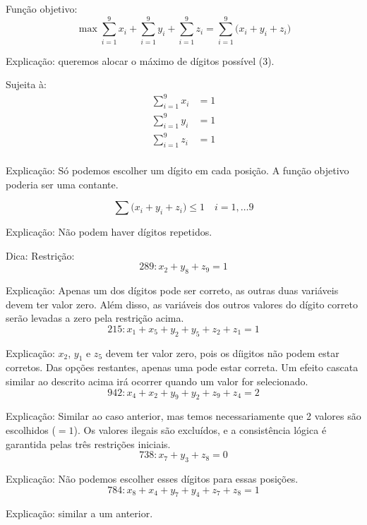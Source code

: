 \documentclass{article}
\begin{document}
Função objetivo:
\[
    \max \sum_{i = 1}^{9} x_i + \sum_{i = 1}^{9} y_i + \sum_{i = 1}^{9} z_i = \sum_{i = 1}^{9} \bigl(x_i + y_i + z_i\bigr)
\]

Explicação: queremos alocar o máximo de dígitos possível (3).

Sujeita à:
\begin{align*}
    \sum_{i=1}^{9} x_i &= 1\\
    \sum_{i=1}^{9} y_i &= 1\\
    \sum_{i=1}^{9} z_i &= 1\\
\end{align*}

Explicação: Só podemos escolher um dígito em cada posição. A função objetivo poderia ser uma contante.

\[ 
    \sum \big(x_i + y_i + z_i\big) \leq 1\quad i = 1,\dots9
\]

Explicação: Não podem haver dígitos repetidos.

\centering Dica: Restrição: 
    \[289\colon x_2 + y_8 + z_9 = 1 \]
    
    Explicação: Apenas um dos dígitos pode ser correto, as outras duas variáveis devem ter valor zero. Além disso, as variáveis dos outros valores do dígito correto serão levadas a zero pela restrição acima.
    \[215\colon x_1 + x_5 + y_2 + y_5 + z_2 + z_1 = 1 \]
    
    Explicação: $x_2$, $y_1$ e $z_5$ devem ter valor zero, pois os díigitos não podem estar corretos. Das opções restantes, apenas uma pode estar correta. Um efeito cascata similar ao descrito acima irá ocorrer quando um valor for selecionado.
    \[942\colon x_4 + x_2 + y_9 + y_2 + z_9 + z_4 = 2 \]
    
    Explicação: Similar ao caso anterior, mas temos necessariamente que 2 valores são escolhidos ($=1$). Os valores ilegais são excluídos, e a consistência lógica é garantida pelas três restrições iniciais.   
    \[738\colon x_7 + y_3 + z_8 = 0 \]
    
    Explicação: Não podemos escolher esses dígitos para essas posições.
    \[784\colon x_8 + x_4 + y_7 + y_4 + z_7 + z_8 = 1 \]
    
    Explicação: similar a um anterior. 

\end{document}
